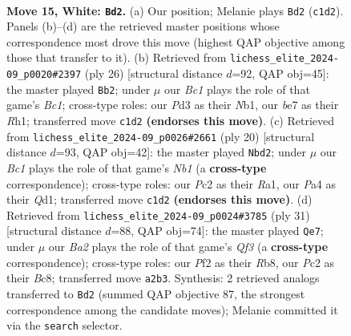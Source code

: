 \documentclass[11pt]{article}
\begin{document}
\clearpage

\begin{figure}[p]\centering
\begin{subfigure}{0.46\textwidth}\centering
\resizebox{\linewidth}{!}{%
\newchessgame
\chessboard[
  setfen={2bq1rk1/r1p1bp1p/p2p1np1/n3p3/Pp2P3/3P1Q1N/BPP2PPP/RNB1R1K1 w - - 4 15},
  showmover=false,
  pgfstyle=straightmove, color=movearrow, markmove={c1-d2}
]}
\caption{}
\end{subfigure}\hfill
\begin{subfigure}{0.46\textwidth}\centering
\resizebox{\linewidth}{!}{%
\newchessgame
\chessboard[
  setfen={rnbq1rkn/1p5p/1b2p1pP/p2pPp2/1P6/P2B1NQ1/2P2PP1/RNB1K2R w KQ - 0 14},
  showmover=false,
  pgfstyle=straightmove, color=movearrow, markmove={c1-b2}
]}
\caption{}
\end{subfigure}
\\[4pt]
\begin{subfigure}{0.46\textwidth}\centering
\resizebox{\linewidth}{!}{%
\newchessgame
\chessboard[
  setfen={r1bq1rk1/2p2pp1/pbnp1n1p/1p2p3/4P2B/1BPP1N2/PP3PPP/RN1Q1RK1 w - - 2 11},
  showmover=false,
  pgfstyle=straightmove, color=movearrow, markmove={b1-d2}
]}
\caption{}
\end{subfigure}\hfill
\begin{subfigure}{0.46\textwidth}\centering
\resizebox{\linewidth}{!}{%
\newchessgame
\chessboard[
  setfen={1rb1r1k1/bp3ppp/p1pp1q2/4n3/1PPN4/PQ2P1PP/1B3PB1/R4RK1 b - - 0 16},
  showmover=false,
  pgfstyle=straightmove, color=movearrow, markmove={f6-e7}
]}
\caption{}
\end{subfigure}
\caption{\textbf{Move 15, White: \texttt{Bd2}.} (a) Our position; Melanie plays \texttt{Bd2} (\texttt{c1d2}). Panels (b)--(d) are the retrieved master positions whose correspondence most drove this move (highest QAP objective among those that transfer to it). (b) Retrieved from \texttt{lichess\_elite\_2024-09\_p0020\#2397} (ply 26) [structural distance $d$=92, QAP obj=45]: the master played \texttt{Bb2}; under $\mu$ our \emph{Bc1} plays the role of that game's \emph{Bc1}; cross-type roles: our \emph{P}d3 as their \emph{N}b1, our \emph{b}e7 as their \emph{R}h1; transferred move \texttt{c1d2} \textbf{(endorses this move)}. (c) Retrieved from \texttt{lichess\_elite\_2024-09\_p0026\#2661} (ply 20) [structural distance $d$=93, QAP obj=42]: the master played \texttt{Nbd2}; under $\mu$ our \emph{Bc1} plays the role of that game's \emph{Nb1} (a \textbf{cross-type} correspondence); cross-type roles: our \emph{P}c2 as their \emph{R}a1, our \emph{P}a4 as their \emph{Q}d1; transferred move \texttt{c1d2} \textbf{(endorses this move)}. (d) Retrieved from \texttt{lichess\_elite\_2024-09\_p0024\#3785} (ply 31) [structural distance $d$=88, QAP obj=74]: the master played \texttt{Qe7}; under $\mu$ our \emph{Ba2} plays the role of that game's \emph{Qf3} (a \textbf{cross-type} correspondence); cross-type roles: our \emph{P}f2 as their \emph{R}b8, our \emph{P}c2 as their \emph{B}c8; transferred move \texttt{a2b3}. Synthesis: 2 retrieved analogs transferred to \texttt{Bd2} (summed QAP objective 87, the strongest correspondence among the candidate moves); Melanie committed it via the \texttt{search} selector.}
\label{fig:thought-m28}
\end{figure}
\end{document}
